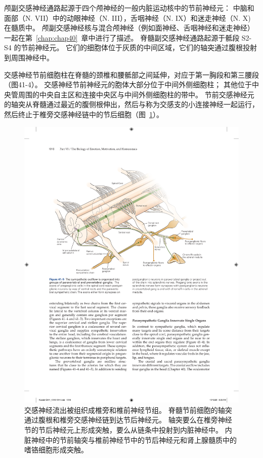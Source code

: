 颅副交感神经通路起源于四个颅神经的一般内脏运动核中的节前神经元：
中脑和面部（N. VII）中的动眼神经（N. III），舌咽神经（N. IX）和迷走神经（N. X) 在髓质中。 颅副交感神经核与混合颅神经（例如面神经、舌咽神经和迷走神经）一起在第~\ref{chap:chap40}~章中进行了描述。
脊髓副交感神经通路起源于骶段 S2-S4 的节前神经元。
它们的细胞体位于灰质的中间区域，它们的轴突通过腹根投射到周围神经中。


交感神经节前细胞柱在脊髓的颈椎和腰骶部之间延伸，对应于第一胸段和第三腰段（图41-4）。
交感神经节前神经元的胞体大部分位于中间外侧细胞柱；
其他位于中央管周围的中央自主区和连接中央区与中间外侧细胞柱的带中。
节前交感神经元的轴突从脊髓通过最近的腹侧根伸出，然后与称为交感支的小连接神经一起运行，然后终止于椎旁交感神经链中的节后细胞（图~\ref{fig:41_5}）。


\begin{figure}[htbp]
	\centering
	\includegraphics[width=0.95\linewidth]{chap41/fig_41_5}
	\caption{交感神经流出被组织成椎旁和椎前神经节组。 脊髓节前细胞的轴突通过腹根和椎旁交感神经链到达节后神经元。 轴突要么在椎旁神经节的节后神经元上形成突触，要么从链条中投射到内脏神经中。 内脏神经中的节前轴突与椎前神经节中的节后神经元和肾上腺髓质中的嗜铬细胞形成突触。}
	\label{fig:41_5}
\end{figure}


